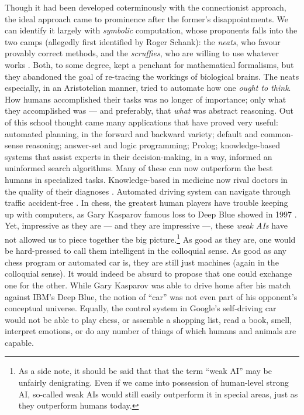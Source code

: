 Though it had been developed coterminously with the connectionist approach, the ideal approach came to prominence after the former's disappointments. We can identify it largely with {\em symbolic} computation, whose proponents falls into the two camps (allegedly first identified by Roger Schank): the {\em neats}, who favour provably correct methods, and the {\em scruffies}, who are willing to use whatever works \cite[pp. 421–424]{McCorduck2004}. Both, to some degree, kept a penchant for mathematical formalisms, but they abandoned the goal of re-tracing the workings of biological brains. The neats especially, in an Aristotelian manner, tried to automate how one {\em ought to think}. How humans accomplished their tasks was no longer of importance; only what they accomplished was --- and preferably, that {\em what} was abstract reasoning. Out of this school thought came many applications that have proved very useful: automated planning, in the forward and backward variety; default and common-sense reasoning; answer-set and logic programming; Prolog; knowledge-based systems that assist experts in their decision-making, in a way, informed an uninformed search algorithms. Many of these can now outperform the best humans in specialized tasks. Knowledge-based in medicine now rival doctors in the quality of their diagnoses \cite[p. 592, Table 31-1]{mycin}. Automated driving system can navigate through traffic accident-free \cite{googleCar}. In chess, the greatest human players have trouble keeping up with computers, as Gary Kasparov famous loss to Deep Blue showed in 1997 \cite{deepBlue}. Yet, impressive as they are --- and they are impressive ---, these {\em weak AIs} have not allowed us to piece together the big picture.\footnote{As a side note, it should be said that that the term ``weak AI'' may be unfairly denigrating. Even if we came into possession of human-level strong AI, so-called weak  AIs would still easily outperform it in special areas, just as they outperform humans today.} As good as they are, one would be hard-pressed to call them intelligent in the colloquial sense. As good as any chess program or automated car is, they are still just machines (again in the colloquial sense). It would indeed be absurd to propose that one could exchange one for the other. While Gary Kasparov was able to drive home after his match against IBM's Deep Blue, the notion of ``car'' was not even part of his opponent's conceptual universe. Equally, the control system in Google's self-driving car would not be able to play chess, or assemble a shopping list, read a book, smell, interpret emotions, or do any number of things of which humans and animals are capable.

